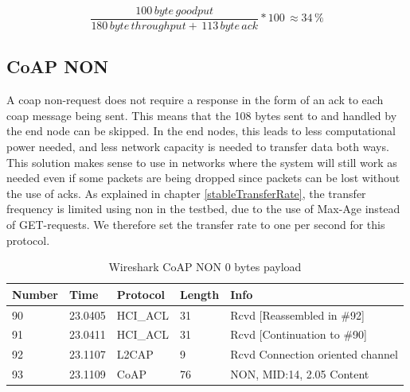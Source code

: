 \begin{equation} \label{percentage}
    \frac{100 \, byte \, goodput}{180 \, byte \, throughput + \, 113 \, byte \, ack}*100 \, \approx 34 \,\%
\end{equation}



\subsection{CoAP NON}

\noindent A \gls{coap} \gls{non}-request does not require a response in the form of an \gls{ack} to each \gls{coap} message being sent. This means that the 108 bytes sent to and handled by the end node can be skipped. In the end nodes, this leads to less computational power needed, and less network capacity is needed to transfer data both ways. This solution makes sense to use in networks where the system will still work as needed even if some packets are being dropped since packets can be lost without the use of \glspl{ack}. As explained in chapter \ref{stableTransferRate}, the transfer frequency is limited using \gls{non} in the testbed, due to the use of Max-Age instead of GET-requests. We therefore set the transfer rate to one per second for this protocol. 

\begin{table}[ht]
\small
\centering
\caption{Wireshark CoAP NON 0 bytes payload}
\label{coapNON0table}
\begin{tabular}{lllll}
\hline
Number & Time    & Protocol & Length & Info                             \\ \hline
90     & 23.0405 & HCI\_ACL & 31     & Rcvd {[}Reassembled in \#92{]}   \\
91     & 23.0411 & HCI\_ACL & 31     & Rcvd {[}Continuation to \#90{]}  \\
92     & 23.1107 & L2CAP    & 9      & Rcvd Connection oriented channel \\
93     & 23.1109 & CoAP     & 76     & NON, MID:14, 2.05 Content        \\ \hline
\end{tabular}
\end{table}


